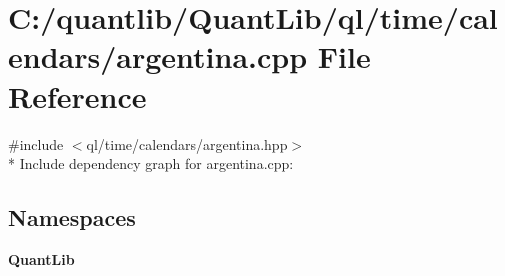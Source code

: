\section{C\+:/quantlib/\+Quant\+Lib/ql/time/calendars/argentina.cpp File Reference}
\label{argentina_8cpp}
{\ttfamily \#include $<$ql/time/calendars/argentina.\+hpp$>$}\\*
Include dependency graph for argentina.\+cpp\+:
\subsection*{Namespaces}
\begin{DoxyCompactItemize}
\item 
 {\bf Quant\+Lib}
\end{DoxyCompactItemize}
